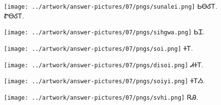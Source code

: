 \documentclass[avery5371,frame]{flashcards}%
\begin{document}
\begin{flashcard}{
\texttt{[image: ../artwork/answer-pictures/07/pngs/sunalei.png]}
}\Huge ᏏᎾᎴᎢ.\\ᏑᎾᎴᎢ.
\end{flashcard}

\begin{flashcard}{
\texttt{[image: ../artwork/answer-pictures/07/pngs/sihgwa.png]}
}\Huge ᏏᏆ.
\end{flashcard}

\begin{flashcard}{
\texttt{[image: ../artwork/answer-pictures/07/pngs/soi.png]}
}\Huge ᏐᎢ.
\end{flashcard}

\begin{flashcard}{
\texttt{[image: ../artwork/answer-pictures/07/pngs/disoi.png]}
}\Huge ᏗᏐᎢ.
\end{flashcard}

\begin{flashcard}{
\texttt{[image: ../artwork/answer-pictures/07/pngs/soiyi.png]}
}\Huge ᏐᎢᏱ.
\end{flashcard}

\begin{flashcard}{
\texttt{[image: ../artwork/answer-pictures/07/pngs/svhi.png]}
}\Huge ᏒᎯ.
\end{flashcard}
\end{document}
